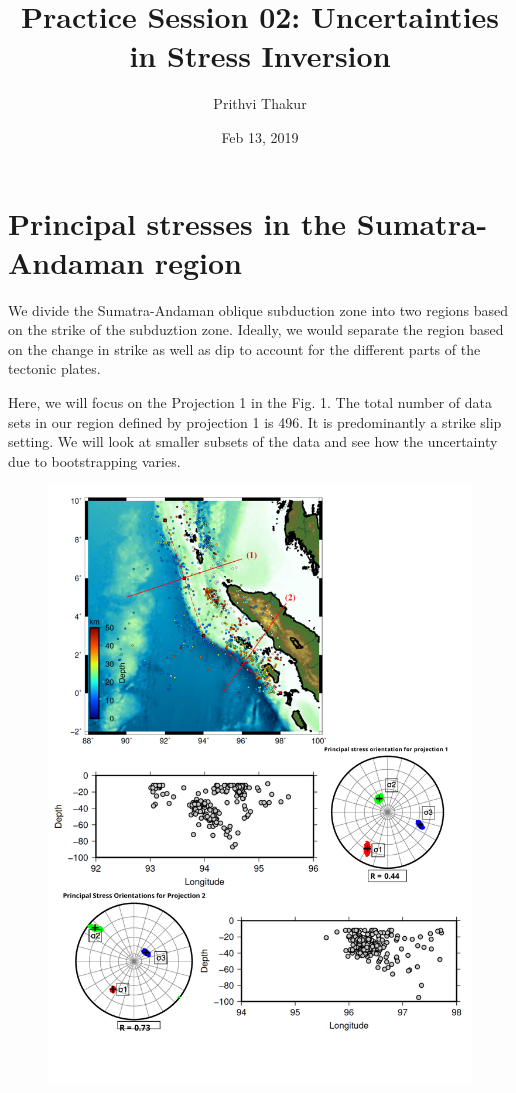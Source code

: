 \documentclass[11pt]{article}
\title{Practice Session 02: Uncertainties in Stress Inversion}
\author{Prithvi Thakur}
\date{Feb 13, 2019}
\begin{document}
\maketitle

\section*{Principal stresses in the Sumatra-Andaman region}
We divide the Sumatra-Andaman oblique subduction zone into two regions  based on the strike of the subduztion zone. Ideally, we would separate the region based on the change in strike as well as dip to account for the different parts of the tectonic plates.

Here, we will focus on the Projection 1 in the Fig. 1. The total number of data sets in our region defined by projection 1 is 496. It is predominantly a strike slip setting. We will look at smaller subsets of the data and see how the uncertainty due to bootstrapping varies.

\begin{figure}[!htb]
    \centering
    \includegraphics[scale=0.7]{fig1.pdf}
\end{figure}
\end{document}
